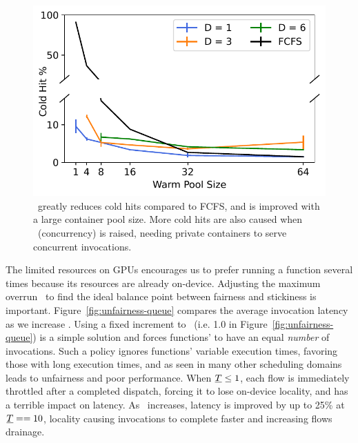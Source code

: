 \begin{figure}
  \centering
  \includegraphics{mqfq/graphs/container_pool/big-60min/65/cold_hits.pdf}
  \caption{\QName~greatly reduces cold hits compared to FCFS, and is improved with a large container pool size. 
          More cold hits are also caused when \D~(concurrency) is raised, needing private containers to serve concurrent invocations.}
    \label{fig:container-pool-cold-hits}
\end{figure}

The limited resources on GPUs encourages us to prefer running a function several times because its resources are already on-device.
Adjusting the maximum overrun \T~to find the ideal balance point between fairness and stickiness is important.
Figure~\ref{fig:unfairness-queue} compares the average invocation latency as we increase \T.
Using a fixed increment to \VT~(i.e. 1.0 in Figure~\ref{fig:unfairness-queue}) is a simple solution and forces functions' to have an equal \emph{number} of invocations.
Such a policy ignores functions' variable execution times, favoring those with long execution times, and as seen in many other scheduling domains leads to unfairness and poor performance.
When $\emph{T} \le 1$, each flow is immediately throttled after a completed dispatch, forcing it to lose on-device locality, and has a terrible impact on latency.
As \T~increases, latency is improved by up to 25\% at $\emph{T} == 10$, locality causing invocations to complete faster and increasing flows drainage.

